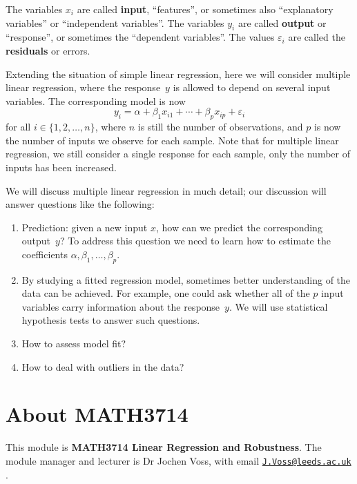 \documentclass[
  a4paper,
]{article}
\providecommand{\tightlist}{%
  \setlength{\itemsep}{0pt}\setlength{\parskip}{0pt}}
\theoremstyle{definition}
\theoremstyle{definition}
\theoremstyle{definition}
\theoremstyle{definition}
\theoremstyle{remark}
\begin{document}
The variables \(x_i\) are called \textbf{input}, ``features'', or
sometimes also ``explanatory variables'' or ``independent variables''.
The variables \(y_i\) are called \textbf{output} or ``response'', or sometimes the
``dependent variables''. The values \(\varepsilon_i\) are called the \textbf{residuals} or errors.

Extending the situation of simple linear regression, here
we will consider multiple linear regression, where the response~\(y\)
is allowed to depend on several input variables. The corresponding
model is now
\begin{equation*}
  y_i = \alpha + \beta_1 x_{i1} + \cdots + \beta_p x_{ip} + \varepsilon_i
\end{equation*}
for all \(i \in \{1, 2, \ldots, n\}\), where \(n\) is still the number
of observations, and \(p\) is now the number of inputs we observe for
each sample.
Note that for multiple linear regression, we still consider a
single response for each sample, only the number of inputs has been
increased.

We will discuss multiple linear regression in much detail; our discussion
will answer questions like the following:

\begin{enumerate}
\def\labelenumi{\arabic{enumi}.}
\tightlist
\item
  Prediction: given a new input \(x\), how can we predict
  the corresponding output~\(y\)? To address this question
  we need to learn how to estimate the coefficients \(\alpha, \beta_1, \ldots, \beta_p\).
\item
  By studying a fitted regression model, sometimes better understanding
  of the data can be achieved. For example, one could ask whether
  all of the \(p\) input variables carry information about the response~\(y\).
  We will use statistical hypothesis tests to answer such questions.
\item
  How to assess model fit?
\item
  How to deal with outliers in the data?
\end{enumerate}

\clearpage

\hypertarget{S00-about}{%
\section*{About MATH3714}\label{S00-about}}

This module is \textbf{MATH3714 Linear Regression and Robustness}. The
module manager and lecturer is Dr Jochen Voss,
with email \href{mailto:J.Voss@leeds.ac.uk}{\nolinkurl{J.Voss@leeds.ac.uk}} .
\end{document}

